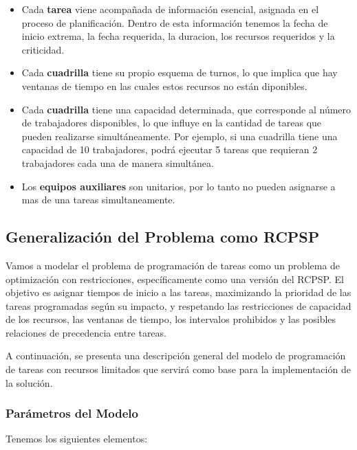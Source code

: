 \documentclass{article}
\begin{document}
\begin{itemize}
    \item Cada \textbf{tarea} viene acompañada de información esencial, asignada en el proceso de planificación. Dentro de esta información tenemos la fecha de inicio extrema, la fecha requerida, la duracion, los recursos requeridos y la criticidad.
    
    \item Cada \textbf{cuadrilla} tiene su propio esquema de turnos, lo que implica que hay ventanas de tiempo en las cuales estos recursos no están diponibles.
    
    \item Cada \textbf{cuadrilla} tiene una capacidad determinada, que corresponde al número de trabajadores disponibles, lo que influye en la cantidad de tareas que pueden realizarse simultáneamente. Por ejemplo, si una cuadrilla tiene una capacidad de 10 trabajadores, podrá ejecutar 5 tareas que requieran 2 trabajadores cada una de manera simultánea.
    
    \item Los \textbf{equipos auxiliares} son unitarios, por lo tanto no pueden asignarse a mas de una tareas simultaneamente.
\end{itemize}


\subsection{Generalización del Problema como RCPSP}

Vamos a modelar el problema de programación de tareas como un problema de optimización con restricciones, específicamente como una versión del RCPSP. El objetivo es asignar tiempos de inicio a las tareas, maximizando la prioridad de las tareas programadas según su impacto, y respetando las restricciones de capacidad de los recursos, las ventanas de tiempo, los intervalos prohibidos y las posibles relaciones de precedencia entre tareas.

A continuación, se presenta una descripción general del modelo de programación de tareas con recursos limitados que servirá como base para la implementación de la solución.

\subsubsection{Parámetros del Modelo}

Tenemos los siguientes elementos:
\end{document}
